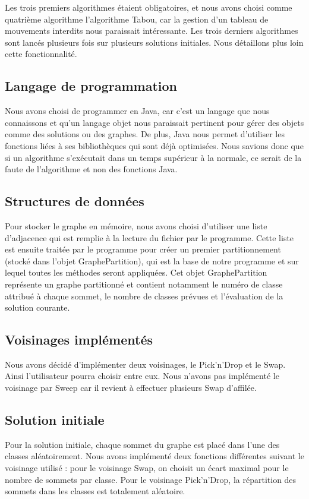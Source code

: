 \documentclass[12pt]{article}
\begin{document}
Les trois premiers algorithmes étaient obligatoires, et nous avons choisi comme quatrième algorithme l’algorithme Tabou, car la gestion d’un tableau de mouvements interdits nous paraissait intéressante.
Les trois derniers algorithmes sont lancés plusieurs fois sur plusieurs solutions initiales. Nous détaillons plus loin cette fonctionnalité.

\subsection{Langage de programmation}
    Nous avons choisi de programmer en Java, car c’est un langage que nous connaissons et qu’un langage objet nous paraissait pertinent pour gérer des objets comme des solutions ou des graphes. De plus, Java nous permet d’utiliser les fonctions liées à ses bibliothèques qui sont déjà optimisées. Nous savions donc que si un algorithme s’exécutait dans un temps supérieur à la normale, ce serait de la faute de l’algorithme et non des fonctions Java.

\subsection{Structures de données}
Pour stocker le graphe en mémoire, nous avons choisi d’utiliser une liste d’adjacence qui est remplie à la lecture du fichier par le programme. Cette liste est ensuite traitée par le programme pour créer un premier partitionnement (stocké dans l’objet GraphePartition), qui est la base de notre programme et sur lequel toutes les méthodes seront appliquées. Cet objet GraphePartition représente un graphe partitionné et contient notamment le numéro de classe attribué à chaque sommet, le nombre de classes prévues et l’évaluation de la solution courante.

\subsection{Voisinages implémentés}
Nous avons décidé d’implémenter deux voisinages, le Pick’n'Drop et le Swap. Ainsi l’utilisateur pourra choisir entre eux.
    Nous n’avons pas implémenté le voisinage par Sweep car il revient à effectuer plusieurs Swap d’affilée.

\subsection{Solution initiale}

Pour la solution initiale, chaque sommet du graphe est placé dans l’une des classes aléatoirement. Nous avons implémenté deux fonctions différentes suivant le voisinage utilisé : pour le voisinage Swap, on choisit un écart maximal pour le nombre de sommets par classe. Pour le voisinage Pick'n'Drop, la répartition des sommets dans les classes est totalement aléatoire.
\end{document}
